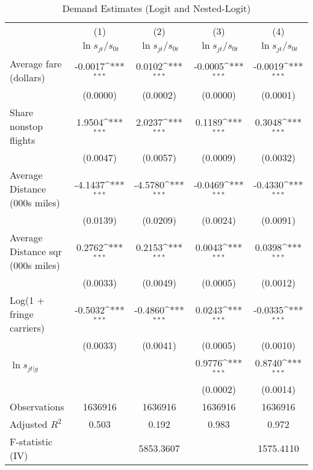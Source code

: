 \begin{table}[htbp]\centering
\def\sym#1{\ifmmode^{#1}\else\(^{#1}\)\fi}
\caption{Demand Estimates (Logit and Nested-Logit)}
\begin{tabular}{l*{4}{c}}
\toprule
                    &\multicolumn{1}{c}{(1)}&\multicolumn{1}{c}{(2)}&\multicolumn{1}{c}{(3)}&\multicolumn{1}{c}{(4)}\\
                    &\multicolumn{1}{c}{$\ln s_{jt}/s_{0t}$}&\multicolumn{1}{c}{$\ln s_{jt}/s_{0t}$}&\multicolumn{1}{c}{$\ln s_{jt}/s_{0t}$}&\multicolumn{1}{c}{$\ln s_{jt}/s_{0t}$}\\
\midrule
Average fare (dollars)&     -0.0017\sym{***}&      0.0102\sym{***}&     -0.0005\sym{***}&     -0.0019\sym{***}\\
                    &    (0.0000)         &    (0.0002)         &    (0.0000)         &    (0.0001)         \\
\addlinespace
Share nonstop flights &      1.9504\sym{***}&      2.0237\sym{***}&      0.1189\sym{***}&      0.3048\sym{***}\\
                    &    (0.0047)         &    (0.0057)         &    (0.0009)         &    (0.0032)         \\
\addlinespace
Average Distance (000s miles)&     -4.1437\sym{***}&     -4.5780\sym{***}&     -0.0469\sym{***}&     -0.4330\sym{***}\\
                    &    (0.0139)         &    (0.0209)         &    (0.0024)         &    (0.0091)         \\
\addlinespace
Average Distance sqr (000s miles)&      0.2762\sym{***}&      0.2153\sym{***}&      0.0043\sym{***}&      0.0398\sym{***}\\
                    &    (0.0033)         &    (0.0049)         &    (0.0005)         &    (0.0012)         \\
\addlinespace
Log(1 + fringe carriers)&     -0.5032\sym{***}&     -0.4860\sym{***}&      0.0243\sym{***}&     -0.0335\sym{***}\\
                    &    (0.0033)         &    (0.0041)         &    (0.0005)         &    (0.0010)         \\
\addlinespace
$\ln s_{jt|g}$      &                     &                     &      0.9776\sym{***}&      0.8740\sym{***}\\
                    &                     &                     &    (0.0002)         &    (0.0014)         \\
\midrule
Observations        &     1636916         &     1636916         &     1636916         &     1636916         \\
Adjusted \(R^{2}\)  &       0.503         &       0.192         &       0.983         &       0.972         \\
F-statistic (IV)    &                     &   5853.3607         &                     &   1575.4110         \\
\bottomrule
\end{tabular}
\end{table}
